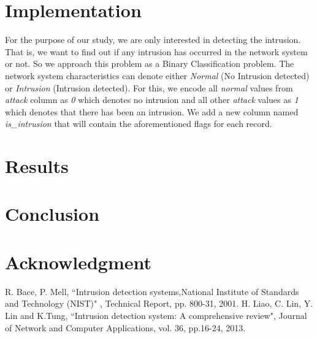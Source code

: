 \documentclass[conference]{IEEEtran}
\begin{document}
\section{Implementation}
For the purpose of our study, we are only interested in detecting the intrusion. That is, we want to find out if any intrusion has occurred in the network system or not. So we approach this problem as a Binary Classification problem. The network system characteristics can denote either \emph{Normal} (No Intrusion detected) or \emph{Intrusion} (Intrusion detected). For this, we encode all \emph{normal} values from \emph{attack} column as \emph{0} which denotes no intrusion and all other \emph{attack} values as \emph{1} which denotes that there has been an intrusion. We add a new column named \emph{is_intrusion} that will contain the aforementioned flags for each record.

\section{Results}

\section{Conclusion}

\section*{Acknowledgment}

\begin{thebibliography}{00}
 R. Bace, P. Mell, ``Intrusion detection systems,National Institute of Standards and
Technology (NIST)" , Technical Report, pp. 800-31, 2001.
 H. Liao, C. Lin, Y. Lin and K.Tung, ``Intrusion detection system: A comprehensive review", Journal of Network and Computer Applications, vol. 36, pp.16-24, 2013.
\end{thebibliography}
\end{document}
